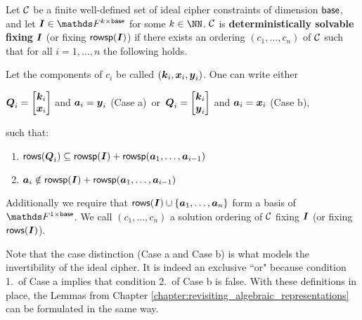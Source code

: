 \begin{defn}
\label{def_det_solvable_ic}
    Let $\mathcal{C}$ be a finite well-defined set of ideal cipher constraints of dimension $\mathsf{base}$,
    and let $\I \in \F^{k \times \base}$ for some $k \in \NN$.
    $\mathcal{C}$ is \textbf{deterministically solvable fixing} $\boldsymbol{I}$ (or fixing $\mathsf{rowsp}(\boldsymbol{I})$)
    if there exists an ordering $(c_1, \dots, c_n)$ of $\mathcal{C}$
    such that for all $i=1, \dots, n$ the following holds.
    
    Let the components of $c_i$ be called $(\boldsymbol k_i, \boldsymbol x_i, \boldsymbol y_i)$.
    One can write either
    \vspace{-4mm}
    \begin{center}
    $\Q_i = \m{\vk_i \\ \vx_i}$ and $\boldsymbol a_i = \boldsymbol y_i$ (Case a) \,or\,
    $\Q_i = \m{\vk_i \\ \vy_i}$ and $\boldsymbol a_i = \boldsymbol x_i$ (Case b),
    \end{center}
    \vspace{-4mm}
    such that:
    
    \begin{enumerate}
    \item
        \label{solvable1_ic}
        $\mathsf{rows}(\boldsymbol{Q}_i) \subseteq \mathsf{rowsp}(\boldsymbol{I}) + \mathsf{rowsp}(\boldsymbol a_1, \dots, \boldsymbol a_{i-1} )$
    \item
        \label{solvable2_ic}
        $\boldsymbol a_i \notin \mathsf{rowsp}(\boldsymbol{I}) + \mathsf{rowsp}(\boldsymbol a_1, \dots, \boldsymbol a_{i-1} )$
    \end{enumerate}
    Additionally we require that $\mathsf{rows}(\boldsymbol{I}) \cup \{\boldsymbol a_1, \dots, \boldsymbol a_n\}$ form a basis of $\F^{1\times\base}$.
    We call $(c_1, \dots, c_n)$ a solution ordering of $\mathcal{C}$ fixing $\boldsymbol{I}$ (or fixing $\mathsf{rows}(\boldsymbol{I})$).
\end{defn}

Note that the case distinction (Case a and Case b) is what models the invertibility of the ideal cipher.
It is indeed an exclusive ``or"
because condition 1.~of Case a implies that condition 2.~of Case b is false.
With these definitions in place, the Lemmas from Chapter \ref{chapter:revisiting_algebraic_representations} can be formulated in the same way.


